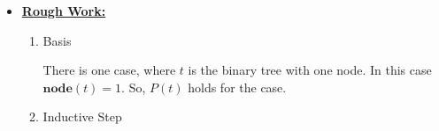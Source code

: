 \documentclass[12pt]{article}
\begin{document}
\begin{itemize}
    \item

    \bigskip

    \begin{mdframed}
        \underline{\textbf{Rough Work:}}

        \bigskip

        \begin{enumerate}[1.]
            \item Basis

            \begin{mdframed}
            There is one case, where $t$ is the binary tree with one node. In
            this case $\textbf{node}(t) = 1$. So, $P(t)$ holds for the case.
            \end{mdframed}

            \item Inductive Step
        \end{enumerate}
    \end{mdframed}
\end{itemize}
\end{document}

